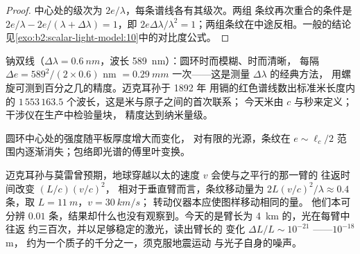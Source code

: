 \begin{proof}
中心处的级次为 $2e/\lambda$，每条谱线各有其级次。两组
条纹再次重合的条件是 $2e/\lambda - 2e/(\lambda + \Delta\lambda) = 1$，即 $2e\Delta\lambda
/\lambda^2 = 1$；两组条纹在中途反相。一般的结论
见\cref{exo:b2:scalar-light-model:10}中的对比度公式。
\end{proof}

\begin{example}[钠双线与米]\label{ex:b2:michelson:sodium}
钠双线（$\Delta\lambda = \qty{0.6}{nm}$，波长 \qty{589}{nm}）：圆环时而模糊、时而清晰，
每隔 $\Delta e = 589^2/(2 \times 0.6)$ nm $= \qty{0.29}{mm}$ 一次——这是测量 $\Delta\lambda$ 的经典方法，
用螺旋可测到百分之几的精度。迈克耳孙于 1892 年
用镉的红色谱线数出标准米长度内的
$1\,553\,163.5$ 个波长，这是米与原子之间的首次联系；
今天米由 $c$ 与秒来定义；
干涉仪在生产中检验量块，
精度达到纳米量级。
\end{example}

\begin{omfigure}

{\small 圆环中心处的强度随平板厚度增大而变化，
对有限的光源，条纹在
$e \sim \ell_c/2$ 范围内逐渐消失；包络即光谱的傅里叶变换。}
\end{omfigure}

\begin{remark}[未测到效应的臂与测到波的臂]\label{rem:b2:michelson:history}
迈克耳孙与莫雷曾预期，地球穿越以太的速度 $v$ 会使与之平行的那一臂的
往返时间改变 $(L/c)(v/c)^2$，
相对于垂直臂而言，条纹移动量为
$2L(v/c)^2/\lambda \approx 0.4$ 条，取 $L = \qty{11}{m}$，$v = \qty{30}{km/s}$；
转动仪器本应使图样移动相同的量。
他们本可分辨 $0.01$ 条，结果却什么也没有观察到。今天的是臂长为 \qty{4}{km} 的，光在每臂中往返
约三百次，并以足够稳定的激光，读出臂长的
变化 $\Delta L/L \sim 10^{-21}$ ——$10^{-18}$ m，
约为一个质子的千分之一，须克服地震运动
与光子自身的噪声。
\end{remark}

